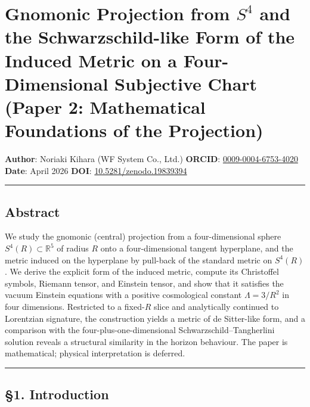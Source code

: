 \documentclass[a4paper,11pt]{article}
\theoremstyle{definition}
\begin{document}
\section{\texorpdfstring{Gnomonic Projection from \(S^4\) and the
Schwarzschild-like Form of the Induced Metric on a Four-Dimensional
Subjective Chart (Paper 2: Mathematical Foundations of the
Projection)}{Gnomonic Projection from S\^{}4 and the Schwarzschild-like Form of the Induced Metric on a Four-Dimensional Subjective Chart (Paper 2: Mathematical Foundations of the Projection)}}\label{gnomonic-projection-from-s4-and-the-schwarzschild-like-form-of-the-induced-metric-on-a-four-dimensional-subjective-chart-paper-2-mathematical-foundations-of-the-projection}

\textbf{Author}: Noriaki Kihara (WF System Co., Ltd.) \textbf{ORCID}:
\href{https://orcid.org/0009-0004-6753-4020}{0009-0004-6753-4020}
\textbf{Date}: April 2026 \textbf{DOI}:
\href{https://doi.org/10.5281/zenodo.19839394}{10.5281/zenodo.19839394}

\begin{center}\rule{0.5\linewidth}{0.5pt}\end{center}

\subsection{Abstract}\label{abstract}

We study the gnomonic (central) projection from a four-dimensional
sphere \(S^4(R) \subset \mathbb{R}^5\) of radius \(R\) onto a
four-dimensional tangent hyperplane, and the metric induced on the
hyperplane by pull-back of the standard metric on \(S^4(R)\). We derive
the explicit form of the induced metric, compute its Christoffel
symbols, Riemann tensor, and Einstein tensor, and show that it satisfies
the vacuum Einstein equations with a positive cosmological constant
\(\Lambda = 3/R^2\) in four dimensions. Restricted to a fixed-\(R\)
slice and analytically continued to Lorentzian signature, the
construction yields a metric of de Sitter-like form, and a comparison
with the four-plus-one-dimensional Schwarzschild--Tangherlini solution
reveals a structural similarity in the horizon behaviour. The paper is
mathematical; physical interpretation is deferred.

\begin{center}\rule{0.5\linewidth}{0.5pt}\end{center}

\subsection{§1. Introduction}\label{introduction}
\end{document}
